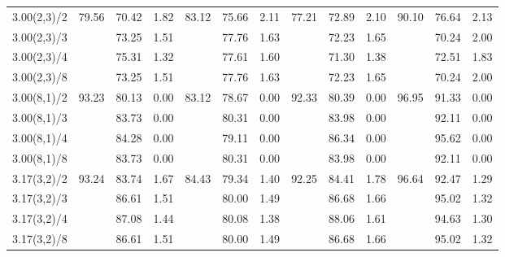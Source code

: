 \documentclass{article}
\theoremstyle{definition}
\theoremstyle{remark}
\begin{document}
\begin{table}[h]
\begin{tabular}{|p{1.45cm}|p{0.65cm}|p{0.65cm}|p{0.65cm}|p{0.65cm}|p{0.65cm}|p{0.65cm}|p{0.65cm}|p{0.65cm}|p{0.65cm}|p{0.65cm}|p{0.65cm}|p{0.65cm}|}
3.00(2,3)/2    &   \multirow{4}{*}{79.56} & 70.42    &    1.82    & \multirow{4}{*}{83.12}   & 75.66    &    2.11    &  \multirow{4}{*}{77.21}  & 72.89    &    2.10    &  \multirow{4}{*}{90.10}  &76.64    &    2.13 \\
3.00(2,3)/3    &    & 73.25    &    1.51    &   & 77.76    &    1.63    &  &  72.23    &    1.65    &  &   70.24    &    2.00 \\
3.00(2,3)/4    &    & 75.31    &    1.32    &   &  77.61    &    1.60    &  &  71.30    &    1.38  &  &    72.51    &    1.83 \\
3.00(2,3)/8    &   &  73.25    &    1.51    &   &  77.76    &    1.63    &  &   72.23    &    1.65    &  &  70.24    &    2.00 \\ \hline
3.00(8,1)/2    &  \multirow{4}{*}{93.23} &  80.13    &    0.00    &   \multirow{4}{*}{83.12} &78.67    &    0.00    & \multirow{4}{*}{92.33}   & 80.39    &    0.00    &  \multirow{4}{*}{96.95}  &91.33    &    0.00 \\
3.00(8,1)/3    &   & 83.73    &    0.00   &  &    80.31    &    0.00    &   &  83.98    &    0.00  &  &    92.11    &    0.00 \\
3.00(8,1)/4    &    & 84.28    &    0.00 &    &    79.11    &    0.00    &    & 86.34    &    0.00    &    & 95.62    &    0.00 \\
3.00(8,1)/8    &    & 83.73    &    0.00  &   &    80.31    &    0.00    &  &  83.98    &    0.00    & &    92.11    &    0.00 \\
\hline
3.17(3,2)/2    &   \multirow{4}{*}{93.24}& 83.74    &    1.67    &  \multirow{4}{*}{84.43}  &79.34    &    1.40    &   \multirow{4}{*}{92.25}  & 84.41    &    1.78    &    \multirow{4}{*}{96.64} & 92.47    &    1.29 \\
3.17(3,2)/3    &   &  86.61    &    1.51    &    & 80.00    &    1.49    & &    86.68    &    1.66   &  &    95.02    &    1.32 \\
3.17(3,2)/4    &    & 87.08    &    1.44    &   &  80.08    &    1.38  &  &    88.06    &  1.61   &  &    94.63    &    1.30 \\
3.17(3,2)/8    &    & 86.61    &    1.51    &   &  80.00    &    1.49   &  &    86.68    &    1.66  &   &    95.02    &    1.32 \\

\end{tabular}
\end{table}
\end{document}
